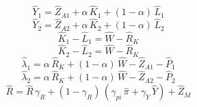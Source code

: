 \begin{dmath}
{{\hat{Y}_{1}}}={{\hat{Z}_{A1}}}+{{\alpha}}\, {{\hat{K}_{1}}}+\left(1-{{\alpha}}\right)\, {{\hat{L}_{1}}}
\end{dmath}
\begin{dmath}
{{\hat{Y}_{2}}}={{\hat{Z}_{A2}}}+{{\alpha}}\, {{\hat{K}_{2}}}+\left(1-{{\alpha}}\right)\, {{\hat{L}_{2}}}
\end{dmath}
\begin{dmath}
{{\hat{K}_{1}}}-{{\hat{L}_{1}}}={{\hat{W}}}-{{\hat{R}_{K}}}
\end{dmath}
\begin{dmath}
{{\hat{K}_{2}}}-{{\hat{L}_{2}}}={{\hat{W}}}-{{\hat{R}_{K}}}
\end{dmath}
\begin{dmath}
{{\hat{\lambda}_{1}}}={{\alpha}}\, {{\hat{R}_{K}}}+\left(1-{{\alpha}}\right)\, {{\hat{W}}}-{{\hat{Z}_{A1}}}-{{\hat{P}_{1}}}
\end{dmath}
\begin{dmath}
{{\hat{\lambda}_{2}}}={{\alpha}}\, {{\hat{R}_{K}}}+\left(1-{{\alpha}}\right)\, {{\hat{W}}}-{{\hat{Z}_{A2}}}-{{\hat{P}_{2}}}
\end{dmath}
\begin{dmath}
{{\hat{R}}}={{\hat{R}}}\, {{\gamma_{R}}}+\left(1-{{\gamma_{R}}}\right)\, \left({{\gamma_{pi}}}\, {{\hat{\pi}}}+{{\gamma_{Y}}}\, {{\hat{Y}}}\right)+{{\hat{Z}_M}}
\end{dmath}
